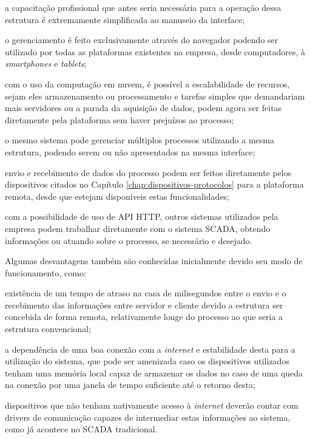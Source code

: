 \begin{alineascomponto}
    \item a capacitação profissional que antes seria necessária para a operação dessa estrutura é extremamente simplificada ao manuseio da interface;
    \item o gerenciamento é feito exclusivamente através do navegador podendo ser utilizado por todas as plataformas existentes na empresa, desde computadores, à \textit{smartphones} e \textit{tablets};
    \item com o uso da computação em nuvem, é possível a escalabilidade de recursos, sejam eles armazenamento ou processamento e tarefas simples que demandariam mais servidores ou a parada da aquisição de dados, podem agora ser feitas diretamente pela plataforma sem haver prejuízos ao processo;
    \item o mesmo sistema pode gerenciar múltiplos processos utilizando a mesma estrutura, podendo serem ou não apresentados na mesma interface;
    \item envio e recebimento de dados do processo podem ser feitos diretamente pelos dispositivos citados no Capítulo \ref{chap:dispositivos-protocolos} para a plataforma remota, desde que estejam disponíveis estas funcionalidades;
    \item com a possibilidade de uso de \gls{API} \gls{HTTP}, outros sistemas utilizados pela empresa podem trabalhar diretamente com o sistema \gls{SCADA}, obtendo informações ou atuando sobre o processo, se necessário e desejado.
\end{alineascomponto}

Algumas desvantagens também são conhecidas inicialmente devido seu modo de funcionamento, como:

\begin{alineascomponto}
    \item existência de um tempo de atraso na casa de milisegundos entre o envio e o recebimento das informações entre servidor e cliente devido a estrutura ser concebida de forma remota, relativamente longe do processo ao que seria a estrutura convencional;
    \item a dependência de uma boa conexão com a \textit{internet} e estabilidade desta para a utilização do sistema, que pode ser amenizada caso os dispositivos utilizados tenham uma memória local capaz de armazenar os dados no caso de uma queda na conexão por uma janela de tempo suficiente até o retorno desta;
    \item dispositivos que não tenham nativamente acesso à \textit{internet} deverão contar com drivers de comunicação capazes de intermediar estas informações ao sistema, como já acontece no \gls{SCADA} tradicional.

\end{alineascomponto}

